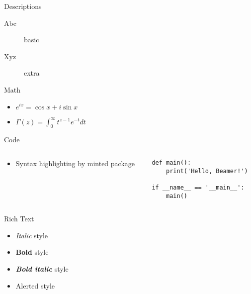 \documentclass[12pt,t,hyperref={pdfencoding=auto}]{beamer}
\begin{document}
\begin{frame}{Descriptions}
  \begin{description}
  \item[Abc] basic
  \item[Xyz] extra
  \end{description}
\end{frame}


\begin{frame}[fragile]{Math}
  \begin{itemize}
    \item $e^{ix} = \cos x + i \sin x$
    \item $\Gamma(z) = \int_0^\infty t^{z-1} e^{-t} dt$
  \end{itemize}
\end{frame}


\begin{frame}[fragile]{Code}
  \begin{columns}
    \begin{column}{0.5\textwidth}
      \begin{itemize}
        \item Syntax highlighting by \alert{minted} package
      \end{itemize}
    \end{column}
    \begin{column}{0.5\textwidth}
      \begin{verbatim}
def main():
    print('Hello, Beamer!')

if __name__ == '__main__':
    main()
      \end{verbatim}
    \end{column}
  \end{columns}
\end{frame}


\begin{frame}{Rich Text}
  \begin{itemize}
  \item \textit{Italic} style
  \item \textbf{Bold} style
  \item \textit{\textbf{Bold italic}} style
  \item \alert{Alerted} style
  \end{itemize}
\end{frame}
\end{document}

